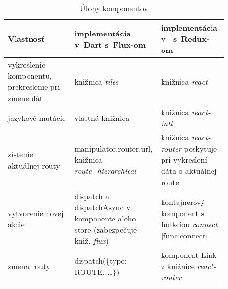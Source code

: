 \begin{comment}
\paragraph{Komponenty v JavaScript-e s Redux-om}
V JavaScriptovej aplikácii máme dva typy komponentov: kontajnerové a prezenčné. 

Prezenčné sú jednoduchšie, priamočiarejšie. Všetky parametre, ktoré potrebujú, by mali dostať od volajúceho komponentu (vrátane funkcií na vytváranie akcií). Nemajú prístup ku celému stavu aplikácie. Mali by to byť hlavne znovu použiteľné komponenty (napríklad riadok tabuľky).

Kontajnerové komponenty sú o niečo zložitejšie. Majú prístup ku celému stavu aplikácie, z ktorého si vyberajú len potrebné časti. Na to nám pomáha funkcia \emph{connect} z knižnice \emph{react-redux}. Kontajnerový komponent vyzerá podobne ako prezenčný, tiež všetko vykresľuje len zo svojich parametrov. 
Funkcia \emph{connect} tvorí medzivrstvu medzi týmto komponentom a jeho exportovaným variantom. Do tohto komponentu doplní potrebné dáta zo stavu. Tieto komponenty sú však menej univerzálne, keďže sú viazané na konkrétne dáta zo stavu.
\end{comment}

\begin{table}
  \caption{Úlohy komponentov}
  \label{table:components}
  \begin{tabular}{| p{0.3\linewidth} | p{0.3\linewidth} | p{0.3\linewidth} |}
   \hline
     Vlastnosť & implementácia v~Dart s~Flux-om & implementácia v~\JS{} s~Redux-om \\
    \hline
    \hline
     vykreslenie komponentu, prekreslenie pri zmene dát & 
     knižnica \emph{tiles} &
     knižnica \emph{react} \\
    \hline
     jazykové mutácie & 
     vlastná knižnica & 
     knižnica \emph{react-intl} \\
    \hline
     zistenie aktuálnej routy & 
     manipulator.router.url, knižnica \emph{route\_hierarchical} & 
     knižnica \emph{react-router} poskytuje pri vykreslení dáta o aktuálnej route \\
    \hline
     vytvorenie novej akcie & 
     dispatch a dispatchAsync v komponente alebo store (zabezpečuje kniž. \emph{flux}) & 
     kontajnerový komponent s funkciou \emph{connect} \ref{func:connect} \\
    \hline
     zmena routy & 
     dispatch(\{type: ROUTE, \ldots\}) & 
     komponent Link z knižnice \emph{react-router} \\
    \hline
   \end{tabular}
\end{table}

